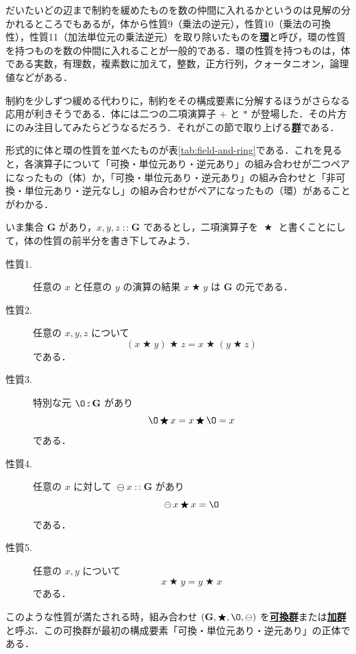 \documentclass[a4paper,twocolumn]{jsbook}
\newcommand{\keyword}[1]{{\underline{\textbf{#1}}}}
\newcommand{\mZero}{\O}
\DeclareMathOperator{\mBinOp}{\bigstar}
\DeclareMathOperator{\mIn}{{:\!:}}
\DeclareMathOperator{\mMinus}{\ominus}
\newcommand{\mSet}[1]{\mathbf{#1}}
\newcommand{\mTupleWith}[1]{\left(#1\right)}
\begin{document}
だいたいどの辺まで制約を緩めたものを数の仲間に入れるかというのは見解の分かれるところでもあるが，体から性質9（乗法の逆元），性質10（乗法の可換性），性質11（加法単位元の乗法逆元）を取り除いたものを\keyword{環}と呼び，環の性質を持つものを数の仲間に入れることが一般的である．環の性質を持つものは，体である実数，有理数，複素数に加えて，整数，正方行列，クォータニオン，論理値などがある．

制約を少しずつ緩める代わりに，制約をその構成要素に分解するほうがさらなる応用が利きそうである．体には二つの二項演算子 $+$ と $*$ が登場した．その片方にのみ注目してみたらどうなるだろう．それがこの節で取り上げる\keyword{群}である．

形式的に体と環の性質を並べたものが表\ref{tab:field-and-ring}である．これを見ると，各演算子について「可換・単位元あり・逆元あり」の組み合わせが二つペアになったもの（体）か，「可換・単位元あり・逆元あり」の組み合わせと「非可換・単位元あり・逆元なし」の組み合わせがペアになったもの（環）があることがわかる．

いま集合 $\mSet{G}$ があり，$x,y,z\mIn\mSet{G}$ であるとし，二項演算子を $\mBinOp$ と書くことにして，体の性質の前半分を書き下してみよう．
\begin{description}
\item[性質1.] 任意の $x$ と任意の $y$ の演算の結果 $x\mBinOp y$ は $\mSet{G}$ の元である．
\item[性質2.] 任意の $x,y,z$ について
\begin{equation}
(x\mBinOp y)\mBinOp z=x\mBinOp(y\mBinOp z)
\end{equation}
である．
\item[性質3.] 特別な元 $\mZero\mIn\mSet{G}$ があり
\begin{equation}
\mZero\mBinOp x=x\mBinOp\mZero=x
\end{equation}
である．
\item[性質4.] 任意の $x$ に対して $\mMinus x\mIn\mSet{G}$ があり
\begin{equation}
\mMinus x\mBinOp x=\mZero
\end{equation}
である．
\item[性質5.] 任意の $x,y$ について
\begin{equation}
x\mBinOp y=y\mBinOp x
\end{equation}
である．
\end{description}
このような性質が満たされる時，組み合わせ $\mTupleWith{\mSet{G},\mBinOp,\mZero,\mMinus}$ を\keyword{可換群}または\keyword{加群}と呼ぶ．この可換群が最初の構成要素「可換・単位元あり・逆元あり」の正体である．
\end{document}
